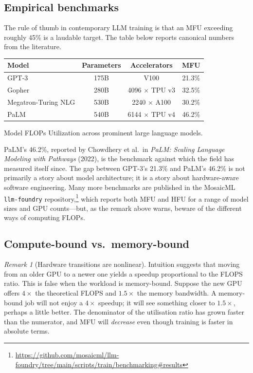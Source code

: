 \documentclass[11pt,a4paper]{article}
\theoremstyle{definition}
\theoremstyle{remark}
\newtheorem*{remark}{Remark}
\theoremstyle{plain}
\begin{document}
\subsection{Empirical benchmarks}

The rule of thumb in contemporary LLM training is that an MFU exceeding
roughly 45\% is a laudable target. The table below reports canonical
numbers from the literature.

\begin{center}
\renewcommand{\arraystretch}{1.25}
\begin{tabular}{@{}lccc@{}}
\toprule
\textbf{Model} & \textbf{Parameters} & \textbf{Accelerators} & \textbf{MFU} \\
\midrule
GPT-3 & 175B & V100 & 21.3\% \\
Gopher & 280B & 4096 $\times$ TPU v3 & 32.5\% \\
Megatron-Turing NLG & 530B & 2240 $\times$ A100 & 30.2\% \\
PaLM & 540B & 6144 $\times$ TPU v4 & 46.2\% \\
\bottomrule
\end{tabular}
\par\smallskip
{\small Model FLOPs Utilization across prominent large language models.}
\end{center}

PaLM's 46.2\%, reported by Chowdhery et al.\ in \emph{PaLM: Scaling
Language Modeling with Pathways} (2022), is the benchmark against which
the field has measured itself since. The gap between GPT-3's 21.3\% and
PaLM's 46.2\% is not primarily a story about model architecture; it is a
story about hardware-aware software engineering. Many more benchmarks are
published in the MosaicML \texttt{llm-foundry}
repository,\footnote{\url{https://github.com/mosaicml/llm-foundry/tree/main/scripts/train/benchmarking\#results}}
which reports both MFU and HFU for a range of model sizes and GPU
counts---but, as the remark above warns, beware of the different ways of
computing FLOPs.

\subsection{Compute-bound vs.\ memory-bound}

\begin{remark}[Hardware transitions are nonlinear]
Intuition suggests that moving from an older GPU to a newer one yields a
speedup proportional to the FLOPS ratio. This is false when the workload
is memory-bound. Suppose the new GPU offers $4\times$ the theoretical
FLOPS and $1.5\times$ the memory bandwidth. A memory-bound job will not
enjoy a $4\times$ speedup; it will see something closer to $1.5\times$,
perhaps a little better. The denominator of the utilisation ratio has
grown faster than the numerator, and MFU will \emph{decrease} even though
training is faster in absolute terms.
\end{remark}
\end{document}
